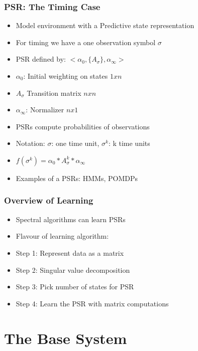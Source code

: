 \documentclass{beamer}
\begin{document}
\begin{frame}
\frametitle{PSR: The Timing Case}

\begin{itemize}
\item Model environment with a Predictive state representation
\item For timing we have a one observation symbol {$\sigma$}
\item PSR defined by: $<\alpha_0, \{A_\sigma\},\alpha_\infty>$
\item[] $\alpha_0$: Initial weighting on states $1xn$
\item[] $A_\sigma$ Transition matrix $nxn$
\item[] $\alpha_\infty$: Normalizer $nx1$

\item PSRs compute probabilities of observations
\item[] Notation: $\sigma$: one time unit, $\sigma^k$: k time units
\item[] $f(\sigma^k) = \alpha_0*A_\sigma^k*\alpha_\infty$
\item Examples of a PSRs: HMMs, POMDPs
 
\end{itemize}

\end{frame}


\begin{frame}
\frametitle{Overview of Learning}

\begin{itemize}
\item Spectral algorithms can learn PSRs 
\item Flavour of learning algorithm: 
\item[] Step 1: Represent data as a matrix
\item[] Step 2: Singular value decomposition
\item[] Step 3: Pick number of states for PSR
\item[] Step 4: Learn the PSR with matrix computations
\end{itemize}

\end{frame}

\section{The Base System}
\end{document}
